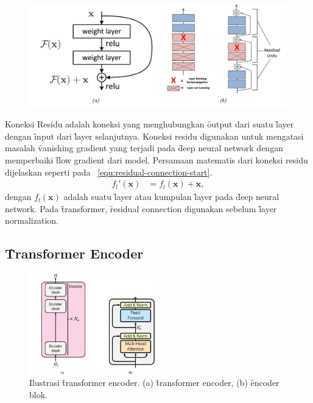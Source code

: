 	\begin{figure}[!ht]
		\centering
		\includegraphics[width=1\textwidth]{assets/pics/residual-connection.png}
		\label{fig:residual-connection}
	\end{figure}
	Koneksi Residu adalah koneksi yang menghubungkan \f{output} dari suatu \f{layer} dengan \f{input} dari \f{layer} selanjutnya. Koneksi residu digunakan untuk mengatasi masalah \f{vanishing gradient} yang terjadi pada \f{deep neural network} dengan memperbaiki \f{flow gradient} dari model. Persamaan matematis dari koneksi residu dijelaskan seperti pada \equ~\ref{equ:residual-connection-start}.
	\begin{align}
		\label{equ:residual-connection-start}
		f_l'(\mathbf{x}) &= f_l(\mathbf{x}) + \mathbf{x},
	\end{align}
dengan $f_l(\mathbf{x})$ adalah suatu \f{layer} atau kumpulan \f{layer} pada \f{deep neural network}.
Pada \f{transformer}, \f{residual connection} digunakan sebelum \f{layer normalization}.

	\subsection{\f{Transformer Encoder}}
	\label{sec:encoder}

	\begin{figure}[!ht]
		\centering
		\includegraphics[width=0.5\textwidth]{assets/pics/final-transformers-encoder.png}
		\caption{Ilustrasi \f{transformer encoder}. (a) \f{transformer encoder}, (b) \f{encoder} blok.}
		\label{fig:transformer-encoder}
	\end{figure}


